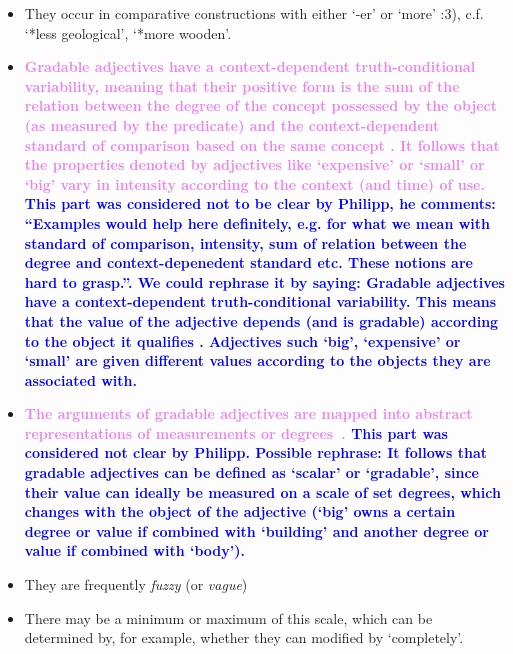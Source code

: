 \documentclass[11pt]{article}
\begin{document}
\begin{itemize}
\item They occur in comparative constructions with either `-er' or `more' \cite{kennedy1999scalar}:3), c.f. `*less geological', `*more wooden'.
\item \textbf{\textcolor{violet}{Gradable adjectives have a context-dependent truth-conditional variability, meaning that their positive form is the sum of the relation between the degree of the concept possessed by the object (as measured by the predicate) and the context-dependent standard of comparison based on the same concept \cite{kennedy2007vagueness}. It follows that the properties denoted by adjectives like `expensive' or `small' or `big' vary in intensity according to the context (and time) of use.} \textcolor{blue}{This part was considered not to be clear by Philipp, he comments: ``Examples would help here definitely, e.g. for what we mean with standard of comparison, intensity, sum of relation between the degree and context-depenedent standard etc. These notions are hard to grasp.''. We could rephrase it by saying: Gradable adjectives have a context-dependent truth-conditional variability. This means that the value of the adjective depends (and is gradable) according to the object it qualifies \cite{kennedy2007vagueness}. Adjectives such `big', `expensive' or `small' are given different values according to the objects they are associated with.}} 
\item \textbf{\textcolor{violet}{The arguments of gradable adjectives are mapped into abstract representations of measurements or degrees~\cite{kennedy2007vagueness}.} \textcolor{blue}{This part was considered not clear by Philipp. Possible rephrase: It follows that gradable adjectives can be defined as `scalar' or `gradable', since their value can ideally be measured on a scale of set degrees, which changes with the object of the adjective (`big' owns a certain degree or value if combined with `building' and another degree or value if combined with `body').}}
\item They are frequently \emph{fuzzy} (or \emph{vague})~\cite{kennedy2007vagueness}

\item There may be a minimum or maximum of this scale, which can be determined
by, for example, whether they can modified by `completely'.
\end{itemize}
\end{document}
